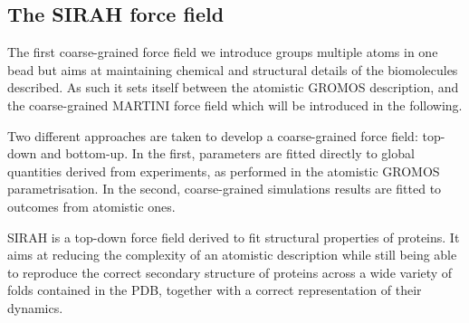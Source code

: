 \subsection{The SIRAH force field}

The first coarse-grained force field we introduce groups multiple atoms in one bead but aims at maintaining chemical and structural details of the biomolecules described. As such it sets itself between the atomistic GROMOS description, and the coarse-grained MARTINI force field \citep{Marrink2007,Monticelli2008,DeJong2013} which will be introduced in the following.

Two different approaches are taken to develop a coarse-grained force field: top-down and bottom-up. In the first, parameters are fitted directly to global quantities derived from experiments, as performed in the atomistic GROMOS parametrisation. In the second, coarse-grained simulations results are fitted to outcomes from atomistic ones.

SIRAH \citep{Darre2015,Machado2018,Barrera2019} is a top-down force field derived to fit structural properties of proteins. It aims at reducing the complexity of an atomistic description while still being able to reproduce the correct secondary structure of proteins across a wide variety of folds contained in the PDB, together with a correct representation of their dynamics.

